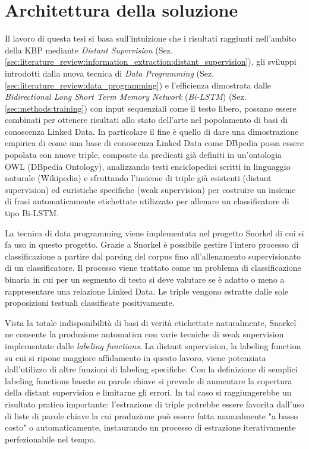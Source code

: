 %
\chapter{Architettura della soluzione}
\label{sec:methods}


Il lavoro di questa tesi si basa sull'intuizione che i risultati raggiunti nell'ambito della KBP mediante \textit{Distant Supervision} (Sez. \ref{sec:literature_review:information_extraction:distant_supervision}), gli sviluppi introdotti dalla nuova tecnica di \textit{Data Programming} (Sez. \ref{sec:literature_review:data_programming}) e l'efficienza dimostrata dalle \textit{Bidirectional Long Short Term Memory Network} (\textit{Bi-LSTM}) (Sez. \ref{sec:methods:training}) con input sequenziali come il testo libero, possano essere combinati per ottenere risultati allo stato dell'arte nel popolamento di basi di conoscenza Linked Data. 
In particolare il fine è quello di dare una dimostrazione empirica di come una base di conoscenza Linked Data come DBpedia possa essere popolata con nuove triple, composte da predicati già definiti in un'ontologia OWL (DBpedia Ontology), analizzando testi enciclopedici scritti in linguaggio naturale (Wikipedia) e sfruttando l'insieme di triple già esistenti (distant supervision) ed euristiche specifiche (weak supervision) per costruire un insieme di frasi automaticamente etichettate utilizzato per allenare un classificatore di tipo Bi-LSTM.

La tecnica di data programming viene implementata nel progetto Snorkel di cui si fa uso in questo progetto. Grazie a Snorkel è possibile gestire l'intero processo di classificazione a partire dal parsing del corpus fino all'allenamento supervisionato di un classificatore. Il processo viene trattato come un problema di classificazione binaria in cui per un segmento di testo si deve valutare se è adatto o meno a rappresentare una relazione Linked Data. Le triple vengono estratte dalle sole proposizioni testuali classificate positivamente.

Vista la totale indisponibilità di basi di verità etichettate naturalmente, Snorkel ne consente la produzione automatica con varie tecniche di weak supervision implementate dalle \textit{labeling functions}. La distant supervision, la labeling function su cui si ripone maggiore affidamento in questo lavoro, viene potenziata dall'utilizzo di altre funzioni di labeling specifiche.
Con la definizione di semplici labeling functions basate su parole chiave si prevede di aumentare la copertura della distant supervision e limitarne gli errori. In tal caso si raggiungerebbe un risultato pratico importante: l'estrazione di triple potrebbe essere favorita dall'uso di liste di parole chiave la cui produzione può essere fatta manualmente "a basso costo" o automaticamente, instaurando un processo di estrazione iterativamente perfezionabile nel tempo.

